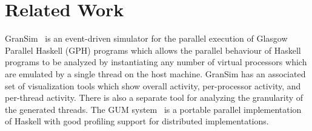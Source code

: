 \section{Related Work}

GranSim~\cite{loidl} is an event-driven simulator for the parallel execution of Glasgow Parallel Haskell (GPH) programs which allows the parallel behaviour of Haskell programs to be analyzed by instantiating any number of virtual processors which are emulated by a single thread on the host machine. GranSim has an associated set of visualization tools which show overall activity, per-processor activity, and per-thread activity. There is also a separate tool for analyzing the granularity of the generated threads. The GUM system~\cite{Trinder:gum} is a portable parallel implementation of Haskell with good profiling support for distributed implementations.